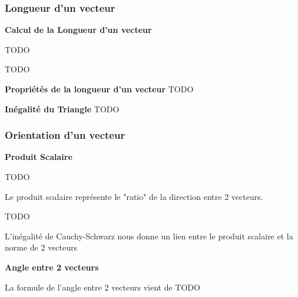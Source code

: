 \documentclass{article}
\begin{document}
\subsubsection{Longueur d'un vecteur}%
\label{ssub:Longueur d'un vecteur}

\textbf{Calcul de la Longueur d'un vecteur}

\begin{definition}
    TODO
\end{definition}

\begin{definition}
    TODO
\end{definition}

\textbf{Propriétés de la longueur d'un vecteur}
TODO

\textbf{Inégalité du Triangle}
TODO

\subsubsection{Orientation d'un vecteur}%
\label{ssub:Orientation d'un vecteur}

\textbf{Produit Scalaire}

\begin{definition}
    TODO
\end{definition}

\begin{intuition}
    Le produit scalaire représente le "ratio" de la direction entre 2 vecteurs.
\end{intuition}

\begin{theorem}
    TODO
\end{theorem}

\begin{theorem}

\end{theorem}

\begin{remark}
    L'inégalité de Cauchy-Schwarz nous donne un lien entre le produit scalaire
    et la norme de 2 vecteurs
\end{remark}

\textbf{Angle entre 2 vecteurs}

\begin{definition}
\end{definition}

\begin{intuition}
    La formule de l'angle entre 2 vecteurs vient de TODO
\end{intuition}
\end{document}

